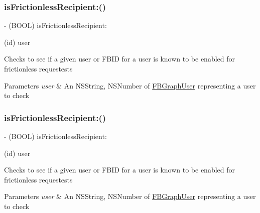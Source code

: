 \subsubsection{\texorpdfstring{is\+Frictionless\+Recipient\+:()}{isFrictionlessRecipient:()}\hspace{0.1cm}{\footnotesize\ttfamily [1/5]}}
{\footnotesize\ttfamily -\/ (B\+O\+OL) is\+Frictionless\+Recipient\+: \begin{DoxyParamCaption}\item[{(id)}]{user }\end{DoxyParamCaption}}

Checks to see if a given user or F\+B\+ID for a user is known to be enabled for frictionless requestests


\begin{DoxyParams}{Parameters}
{\em user} & An N\+S\+String, N\+S\+Number of {\ttfamily \hyperlink{protocolFBGraphUser-p}{F\+B\+Graph\+User}} representing a user to check \\
\hline
\end{DoxyParams}
\mbox{\label{interfaceFBFrictionlessRecipientCache_a9d03bd8dd9a235086cab18ab45b143cd}} 
\subsubsection{\texorpdfstring{is\+Frictionless\+Recipient\+:()}{isFrictionlessRecipient:()}\hspace{0.1cm}{\footnotesize\ttfamily [2/5]}}
{\footnotesize\ttfamily -\/ (B\+O\+OL) is\+Frictionless\+Recipient\+: \begin{DoxyParamCaption}\item[{(id)}]{user }\end{DoxyParamCaption}}

Checks to see if a given user or F\+B\+ID for a user is known to be enabled for frictionless requestests


\begin{DoxyParams}{Parameters}
{\em user} & An N\+S\+String, N\+S\+Number of {\ttfamily \hyperlink{protocolFBGraphUser-p}{F\+B\+Graph\+User}} representing a user to check \\
\hline
\end{DoxyParams}
\mbox{\label{interfaceFBFrictionlessRecipientCache_a9d03bd8dd9a235086cab18ab45b143cd}} 
